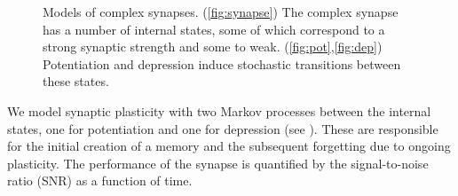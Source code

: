 \documentclass[12pt]{article}
\begin{document}
\begin{figure}
 \begin{center}
 \begin{myenuma}
   \item{}\label{fig:synapse}
   \hspace{0.25cm}
   \item{}\label{fig:pot}
   \hspace{0.25cm}
   \item{}\label{fig:dep}
 \end{myenuma}
 \end{center}
 \caption{Models of complex synapses. (\ref{fig:synapse}) The complex synapse has a number of internal states, some of which correspond to a strong synaptic strength and some to weak. (\ref{fig:pot},\ref{fig:dep}) Potentiation and depression induce stochastic transitions between these states.}\label{fig:compsynapse}
\end{figure}

We model synaptic plasticity with two Markov processes between the internal states, one for potentiation and one for depression (see ).
These are responsible for the initial creation of a memory and the subsequent forgetting due to ongoing plasticity.
The performance of the synapse is quantified by the signal-to-noise ratio (SNR) as a function of time.
\end{document}
